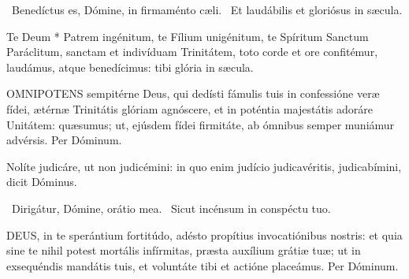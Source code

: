 \V\ Benedíctus es, Dómine, in firmaménto cæli. \R\ Et laudábilis et gloriósus in sæcula.

 Te Deum * Patrem ingénitum, te Fílium unigénitum, te Spíritum Sanctum Paráclitum, sanctam et indivíduam Trinitátem, toto corde et ore confitémur, laudámus, atque benedícimus: tibi glória in sæcula.


\lettrine[lines=2]{O}{MNIPOTENS} sempitérne Deus, qui dedísti fámulis tuis in confessióne veræ fídei, ætérnæ Trinitátis glóriam agnóscere, et in poténtia majestátis adoráre Unitátem: quæsumus; ut, ejúsdem fídei firmitáte, ab ómnibus semper muniámur advérsis. Per Dóminum.


 Nolíte judicáre, ut non judicémini: in quo enim judício judicavéritis, judicabímini, dicit Dóminus.

\V\ Dirigátur, Dómine, orátio mea. \R\ Sicut incénsum in conspéctu tuo.


\lettrine[lines=2]{D}{EUS}, in te sperántium fortitúdo, adésto propítius invocatiónibus nostris: et quia sine te nihil potest mortális infírmitas, præsta auxílium grátiæ tuæ; ut in exsequéndis mandátis tuis, et voluntáte tibi et actióne placeámus. Per Dóminum.



